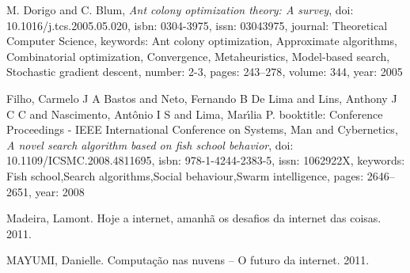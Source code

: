 \documentclass[conference,compsoc]{IEEEtran}
\begin{document}
\begin{thebibliography}{1}
M. Dorigo and C. Blum,
\emph{Ant colony optimization theory: A survey},
doi: {10.1016/j.tcs.2005.05.020},
isbn: {0304-3975},
issn: {03043975},
journal: {Theoretical Computer Science},
keywords: {Ant colony optimization, Approximate algorithms, Combinatorial optimization, Convergence, Metaheuristics, Model-based search, Stochastic gradient descent},
number: {2-3},
pages: {243--278},
volume: {344},
year: {2005}

Filho, Carmelo J A Bastos and Neto, Fernando B De Lima and Lins, Anthony J C C and Nascimento, Ant\^{o}nio I S and Lima, Mar\'{\i}lia P.
booktitle: {Conference Proceedings - IEEE International Conference on Systems, Man and Cybernetics},
\emph{A novel search algorithm based on fish school behavior},
doi: {10.1109/ICSMC.2008.4811695},
isbn: {978-1-4244-2383-5},
issn: {1062922X},
keywords: {Fish school,Search algorithms,Social behaviour,Swarm intelligence},
pages: {2646--2651},
year: {2008}

Madeira, Lamont. Hoje a internet, amanhã os desafios da internet das coisas. 2011.

MAYUMI, Danielle. Computação nas nuvens – O futuro da internet. 2011.



\end{thebibliography}






\end{document}
